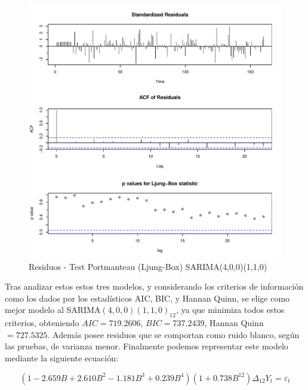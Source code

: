 \documentclass[12pt,oneside]{book}\usepackage[]{graphicx}\usepackage[]{color}
\makeatletter
\def\maxwidth{ %
  \ifdim\Gin@nat@width>\linewidth
    \linewidth
  \else
    \Gin@nat@width
  \fi
}
\newenvironment{knitrout}{}{} %
\theoremstyle{definition} %
\makeatother
\begin{document}
\begin{knitrout}
\color{fgcolor}\begin{figure}[H]

{\centering \includegraphics[width=\maxwidth]{figure/unnamed-chunk-18-1} 

}

\caption{\label{fig:sarima_resid13} Residuos - Test Portmanteau (Ljung-Box) SARIMA(4,0,0)(1,1,0)}\label{fig:unnamed-chunk-18}
\end{figure}


\end{knitrout}


Tras analizar estos estos tres modelos, y considerando los criterios de información como los dados por los estadísticos AIC, BIC, y Hannan Quinn, se elige como mejor modelo al SARIMA$(4,0,0)(1,1,0)_{12}$, ya que minimiza todos estos criterios, obteniendo $AIC=719.2606 $, $BIC=737.2439$, Hannan Quinn$=727.5325$. Además posee residuos que se comportan como ruido blanco, según las pruebas, de  varianza menor. Finalmente podemos representar este modelo mediante la siguiente ecuación:

\begin{equation}\label{eq:sarima}
(1- 2.659 B + 2.610 B^2 - 1.181 B^3  + 0.239 B^4)(1+ 0.738 B^{12})\Delta_{12} Y_t = \varepsilon_t
\end{equation}
\end{document}
